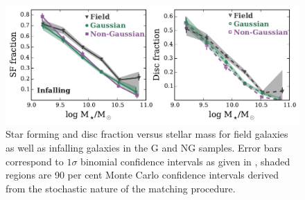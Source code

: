 \documentclass[a4paper,fleqn,usenatbib]{mnras}
\begin{document}
\begin{figure}
  \centering
  \includegraphics[width=\textwidth]{disk_sfFrac_w2_if.pdf}
  \caption{Star forming and disc fraction versus stellar mass for
    field galaxies as well as infalling galaxies in the G and NG
    samples.  Error bars correspond to $1 \sigma$ binomial confidence
    intervals as given in \citet{cameron2011}, shaded regions are 90
    per cent Monte Carlo confidence intervals derived from the
    stochastic nature of the matching procedure.}
  \label{fig:disk_sfFrac_if}
\end{figure}
\end{document}
